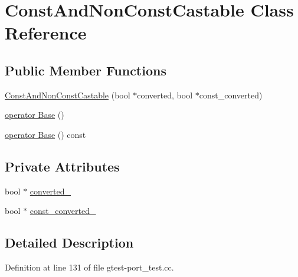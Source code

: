 \hypertarget{classtesting_1_1internal_1_1ConstAndNonConstCastable}{\section{\-Const\-And\-Non\-Const\-Castable \-Class \-Reference}
\label{d3/d02/classtesting_1_1internal_1_1ConstAndNonConstCastable}
}
\subsection*{\-Public \-Member \-Functions}
\begin{DoxyCompactItemize}
\item 
\hyperlink{classtesting_1_1internal_1_1ConstAndNonConstCastable_a41a8f5ffa5793d6e5406eff44bd51ea4}{\-Const\-And\-Non\-Const\-Castable} (bool $\ast$converted, bool $\ast$const\-\_\-converted)
\item 
\hyperlink{classtesting_1_1internal_1_1ConstAndNonConstCastable_af54f90fea7b6604f893833095e77c165}{operator Base} ()
\item 
\hyperlink{classtesting_1_1internal_1_1ConstAndNonConstCastable_a7342de20f79f04b0736acc2aff3f508f}{operator Base} () const 
\end{DoxyCompactItemize}
\subsection*{\-Private \-Attributes}
\begin{DoxyCompactItemize}
\item 
bool $\ast$ \hyperlink{classtesting_1_1internal_1_1ConstAndNonConstCastable_aa9e9eeb1a81afc42911a2a8b17e9618b}{converted\-\_\-}
\item 
bool $\ast$ \hyperlink{classtesting_1_1internal_1_1ConstAndNonConstCastable_a9bb62a6b80a01596c18d29006428a0cc}{const\-\_\-converted\-\_\-}
\end{DoxyCompactItemize}


\subsection{\-Detailed \-Description}


\-Definition at line 131 of file gtest-\/port\-\_\-test.\-cc.



